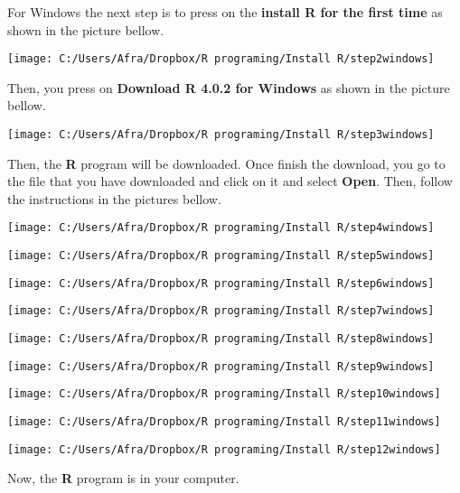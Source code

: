 \documentclass[]{article}
\begin{document}
For Windows the next step is to press on the \textbf{install R for the
first time} as shown in the picture bellow.

\texttt{[image: C:/Users/Afra/Dropbox/R programing/Install R/step2windows]}

Then, you press on \textbf{Download R 4.0.2 for Windows} as shown in the
picture bellow.

\texttt{[image: C:/Users/Afra/Dropbox/R programing/Install R/step3windows]}

Then, the \textbf{R} program will be downloaded. Once finish the
download, you go to the file that you have downloaded and click on it
and select \textbf{Open}. Then, follow the instructions in the pictures
bellow.

\texttt{[image: C:/Users/Afra/Dropbox/R programing/Install R/step4windows]}

\texttt{[image: C:/Users/Afra/Dropbox/R programing/Install R/step5windows]}

\texttt{[image: C:/Users/Afra/Dropbox/R programing/Install R/step6windows]}

\texttt{[image: C:/Users/Afra/Dropbox/R programing/Install R/step7windows]}

\texttt{[image: C:/Users/Afra/Dropbox/R programing/Install R/step8windows]}

\texttt{[image: C:/Users/Afra/Dropbox/R programing/Install R/step9windows]}

\texttt{[image: C:/Users/Afra/Dropbox/R programing/Install R/step10windows]}

\texttt{[image: C:/Users/Afra/Dropbox/R programing/Install R/step11windows]}

\texttt{[image: C:/Users/Afra/Dropbox/R programing/Install R/step12windows]}

Now, the \textbf{R} program is in your computer.
\end{document}
